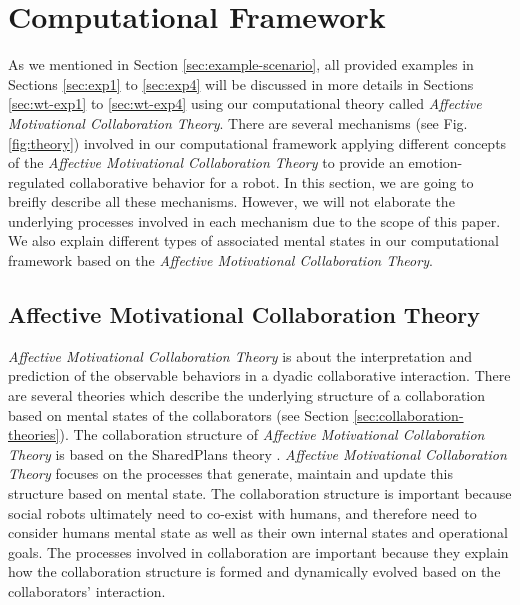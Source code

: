 \section{Computational Framework}
\label{sec:computational-framework}

As we mentioned in Section \ref{sec:example-scenario}, all provided examples in
Sections \ref{sec:exp1} to \ref{sec:exp4} will be discussed in more details in
Sections \ref{sec:wt-exp1} to \ref{sec:wt-exp4} using our computational theory
called \textit{Affective Motivational Collaboration Theory}. There are several
mechanisms (see Fig. \ref{fig:theory}) involved in our computational framework
applying different concepts of the \textit{Affective Motivational Collaboration
Theory} to provide an emotion-regulated collaborative behavior for a robot. In
this section, we are going to breifly describe all these mechanisms. However, we
will not elaborate the underlying processes involved in each mechanism due to
the scope of this paper. We also explain different types of associated mental
states in our computational framework based on the \textit{Affective
Motivational Collaboration Theory}.

\subsection{Affective Motivational Collaboration Theory}
\label{sec:AMCT}

\textit{Affective Motivational Collaboration Theory} is about the interpretation
and prediction of the observable behaviors in a dyadic collaborative
interaction. There are several theories which describe the underlying structure
of a collaboration based on mental states of the collaborators (see Section
\ref{sec:collaboration-theories}). The collaboration structure of
\textit{Affective Motivational Collaboration Theory} is based on the SharedPlans
theory \cite{grosz:planning-acting,grosz:collaboration,grosz:plans-discourse}.
\textit{Affective Motivational Collaboration Theory} focuses on the processes
that generate, maintain and update this structure based on mental state. The
collaboration structure is important because social robots ultimately need to
co-exist with humans, and therefore need to consider humans mental state as
well as their own internal states and operational goals. The processes involved
in collaboration are important because they explain how the collaboration
structure is formed and dynamically evolved based on the collaborators'
interaction.

